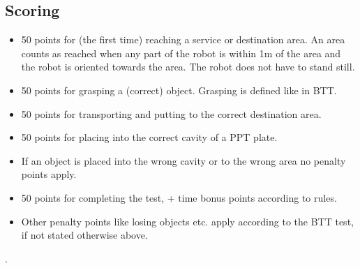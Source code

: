 		
\subsection{Scoring}

\begin{itemize}
\item 50 points for (the first time) reaching a service or destination area. An area counts as reached when any part of the robot is within 1m of the area and the robot is oriented towards the area. The robot does not have to stand still. 
\item 50 points for grasping a (correct) object. Grasping is defined like in BTT. 
\item 50 points for transporting and putting to the correct destination area. 
\item 50 points for placing into the correct cavity of a PPT plate. 
\item If an object is placed into the wrong cavity or to the wrong area no penalty points apply. 
\item 50 points for completing the test, + time bonus points according to rules.
\item Other penalty points like losing objects etc. apply according to the BTT test, if not stated otherwise above.
\end{itemize}

.


